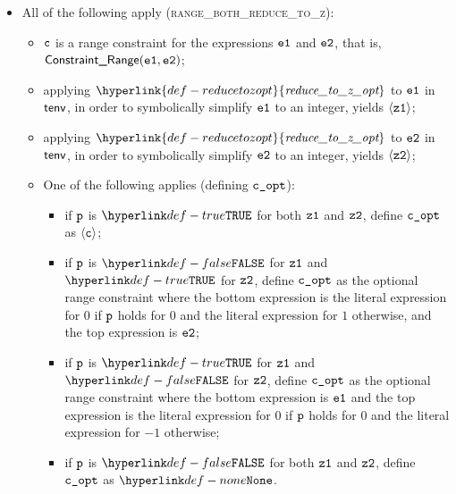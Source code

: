 \documentclass{book}
\newcommand\reducetozopt[0]{\hyperlink{def-reducetozopt}{\textfunc{reduce\_to\_z\_opt}}}
\begin{document}
\begin{itemize}
  \item All of the following apply (\textsc{range\_both\_reduce\_to\_z}):
  \begin{itemize}
    \item $\texttt{c}$ is a range constraint for the expressions $\texttt{e1}$ and $\texttt{e2}$, that is, \\
          $\textsf{Constraint\_Range}(\texttt{e1}, \texttt{e2})$;
    \item applying $\reducetozopt$ to $\texttt{e1}$ in $\textsf{tenv}$, in order to symbolically simplify $\texttt{e1}$ to an integer,
          yields $\langle\texttt{z1}\rangle$;
    \item applying $\reducetozopt$ to $\texttt{e2}$ in $\textsf{tenv}$, in order to symbolically simplify $\texttt{e2}$ to an integer,
          yields $\langle\texttt{z2}\rangle$;
    \item One of the following applies (defining $\texttt{c\_opt}$):
    \begin{itemize}
      \item if $\texttt{p}$ is $\True$ for both $\texttt{z1}$ and $\texttt{z2}$, define $\texttt{c\_opt}$ as $\langle\texttt{c}\rangle$;
      \item if $\texttt{p}$ is $\False$ for $\texttt{z1}$ and $\True$ for $\texttt{z2}$, define $\texttt{c\_opt}$ as the optional range constraint
            where the bottom expression is the literal expression for $0$ if $\texttt{p}$ holds for $0$ and the literal expression for $1$ otherwise,
            and the top expression is $\texttt{e2}$;
      \item if $\texttt{p}$ is $\True$ for $\texttt{z1}$ and $\False$ for $\texttt{z2}$, define $\texttt{c\_opt}$ as the optional range constraint
            where the bottom expression is $\texttt{e1}$ and the top expression is the literal expression for $0$ if $\texttt{p}$ holds for $0$
            and the literal expression for $-1$ otherwise;
      \item if $\texttt{p}$ is $\False$ for both $\texttt{z1}$ and $\texttt{z2}$, define $\texttt{c\_opt}$ as $\None$.
    \end{itemize}
  \end{itemize}


\end{itemize}
\end{document}
